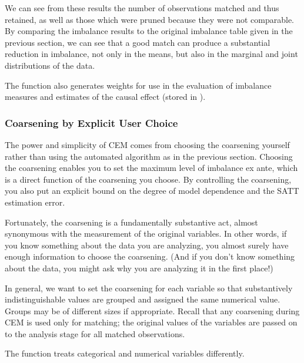\documentclass[article]{jss}
\begin{document}
We can see from these results the number of observations matched and
thus retained, as well as those which were pruned because they were
not comparable.  By comparing the imbalance results to the original
imbalance table given in the previous section, we can see that a good
match can produce a substantial reduction in imbalance, not only in
the means, but also in the marginal and joint distributions of the
data.

The function  also generates weights for use in the
evaluation of imbalance measures and estimates of the causal effect
(stored in ).

\subsubsection{Coarsening by Explicit User Choice}\label{s:cem-user}

The power and simplicity of CEM comes from choosing the coarsening
yourself rather than using the automated algorithm as in the previous
section.  Choosing the coarsening enables you to set the maximum level
of imbalance ex ante, which is a direct function of the coarsening you
choose.  By controlling the coarsening, you also put an explicit bound
on the degree of model dependence and the SATT estimation error.

Fortunately, the coarsening is a fundamentally substantive act, almost
synonymous with the measurement of the original variables.  In other
words, if you know something about the data you are analyzing, you
almost surely have enough information to choose the coarsening.  (And
if you don't know something about the data, you might ask why you are
analyzing it in the first place!) 

In general, we want to set the coarsening for each variable so that
substantively indistinguishable values are grouped and assigned the
same numerical value.  Groups may be of different sizes if
appropriate.  Recall that any coarsening during CEM is used only for
matching; the original values of the variables are passed on to the
analysis stage for all matched observations.

The function  treats categorical and numerical
variables differently.
\end{document}
